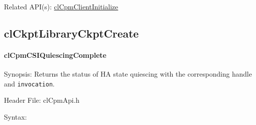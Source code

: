 {\begin{Desc}
\item[Related API(s):]\hyperlink{group__group14}{cl\-Cpm\-Client\-Initialize} \end{Desc}
\newpage




\subsection{clCkptLibraryCkptCreate}
\hypertarget{pagecpm117}{}\paragraph{cl\-Cpm\-CSIQuiescing\-Complete}\label{pagecpm117}
\begin{Desc}
\item[Synopsis:]Returns the status of HA state quiescing with the corresponding handle and {\tt{invocation}}.\end{Desc}
\begin{Desc}
\item[Header File:]clCpmApi.h\end{Desc}
\begin{Desc}
\item[Syntax:]


\end{Desc}}

